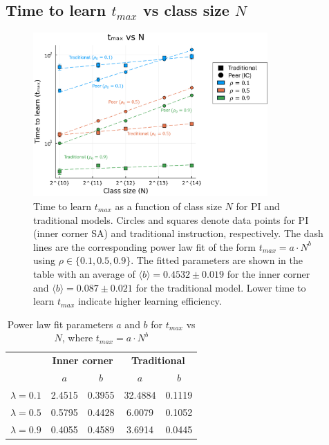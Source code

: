 \newpage

\subsection{Time to learn $t_{max}$ vs class size $N$} \label{subsec: 2DBPCA tmax vs N}
\begin{figure}[h!]
    \centering
    \includegraphics[width=0.8\textwidth]{figures/2D-BPCA-analysis/N_vs_tmax-traditional-inner_corner.png}
    \caption[Class size $N$ dependence of time to learn $t_{max}$ in homogenous classroom models]{Time to learn $t_{max}$ as a function of class size $N$ for PI and traditional models. 
    Circles and squares denote data points for PI (inner corner SA) and traditional instruction, respectively. 
    The dash lines are the corresponding power law fit of the form $t_{max}=a \cdot N^b$ using $\rho \in \lbrace 0.1, 0.5, 0.9 \rbrace$. 
    The fitted parameters are shown in the table with an average of $\langle b \rangle = 0.4532 \pm 0.019$ for the inner corner and $\langle b \rangle = 0.087\pm0.021$ for the traditional model.
    Lower time to learn $t_{max}$ indicate higher learning efficiency.
    }
    \label{fig:Traditional vs PI tmax vs N}
\end{figure}

\begin{table}[htbp!]
  \centering
  
  \begin{tabular}{|c|cc|cc|}
    \hline
    & \multicolumn{2}{c|}{\textbf{Inner corner}}       & \multicolumn{2}{c|}{\textbf{Traditional}}        \\ \cline{2-5} 
    & \multicolumn{1}{c|}{\textbf{$a$}} & \textbf{$b$} & \multicolumn{1}{c|}{\textbf{$a$}} & \textbf{$b$} \\ \hline
    \textbf{$\lambda=0.1$} & \multicolumn{1}{c|}{2.4515}       & 0.3955       & \multicolumn{1}{c|}{32.4884}      & 0.1119       \\ \hline
    \textbf{$\lambda=0.5$} & \multicolumn{1}{c|}{0.5795}       & 0.4428       & \multicolumn{1}{c|}{6.0079}       & 0.1052       \\ \hline
    \textbf{$\lambda=0.9$} & \multicolumn{1}{c|}{0.4055}       & 0.4589       & \multicolumn{1}{c|}{3.6914}       & 0.0445       \\ \hline
  \end{tabular}
  \caption{Power law fit parameters $a$ and $b$ for $t_{max}$ vs $N$, where $t_{max}=a \cdot N ^ b$}
  \label{tab:2DBPCA tmax vs N fit params}
\end{table}

